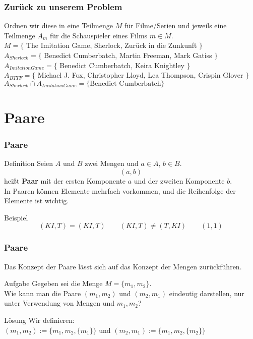 \begin{frame}
	\frametitle{Zurück zu unserem Problem}
	Ordnen wir diese in eine Teilmenge $M$ für Filme/Serien und jeweils eine Teilmenge $A_m$ für die Schauspieler eines Films $m \in M$. \\[0.5em]
	$M = \{$ The Imitation Game, Sherlock, Zurück in die Zunkunft $\}$ \\[0.3em]
	$A_{Sherlock} = \{$ Benedict Cumberbatch, Martin Freeman, Mark Gatiss $\}$ \\
	$A_{Imitation Game} = \{$ Benedict Cumberbatch, Keira Knightley $\}$ \\
	$A_{BTTF} = \{$ Michael J. Fox, Christopher Lloyd, Lea Thompson, Crispin Glover $\}$ \\[2em]
	
	\pause
	$A_{Sherlock} \cap A_{Imitation Game} = \{ \text{Benedict Cumberbatch} \}$
	
\end{frame}

\section{Paare}
\begin{frame}
	\frametitle{Paare}
	\begin{block}{Definition}
		Seien $A$ und $B$ zwei Mengen und $a \in A$, $b \in B$.\\
		$$(a, b)$$ heißt \textbf{Paar} mit der ersten Komponente $a$ und der zweiten Komponente $b$.\\[1em]
		\pause
		In Paaren können Elemente mehrfach vorkommen, und die Reihenfolge der Elemente ist wichtig.\\
	\end{block}

	\pause
	\begin{block}{Beispiel}
		$$ (KI, T) = (KI, T) \qquad (KI, T) \neq (T, KI) \qquad (1, 1) $$
	\end{block}
\end{frame}

\begin{frame}
	\frametitle{Paare}
	Das Konzept der Paare lässt sich auf das Konzept der Mengen zurückführen.
	
	\begin{block}{Aufgabe}
		Gegeben sei die Menge $M = \{m_1, m_2\}$.\\
		Wie kann man die Paare $(m_1, m_2)$ und $(m_2, m_1)$ eindeutig darstellen, nur unter Verwendung von Mengen und $m_1, m_2$?
	\end{block}
	\pause
	\begin{block}{Lösung}
		Wir definieren: \\
		$(m_1, m_2) := \{m_1, m_2, \{m_1\}\}$ und $(m_2, m_1) := \{m_1, m_2, \{m_2\}\}$
	\end{block}
\end{frame}
